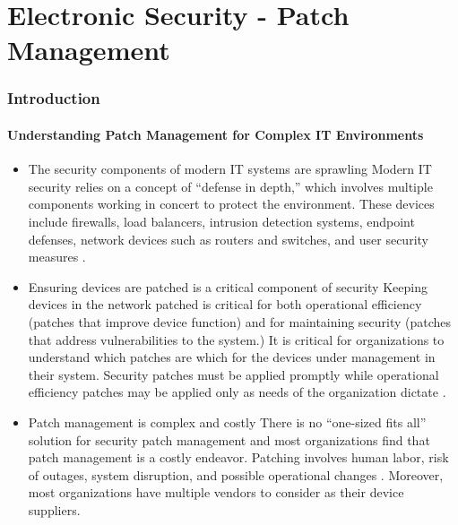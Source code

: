 \section{Electronic Security - Patch Management}
\begin{frame}
  \frametitle{Introduction}
  \framesubtitle{Understanding Patch Management for Complex IT Environments}
  \begin{itemize}
    \item<1-> The security components of modern IT systems are sprawling
       {\scriptsize{Modern IT security relies on a concept of ``defense in depth,'' which involves multiple components working in concert to protect the environment. These devices include firewalls, load balancers, intrusion detection systems, endpoint defenses, network devices such as routers and switches, and user security measures \parencite{cisdid}.}}

    \item<2-> Ensuring devices are patched is a critical component of security
       {\scriptsize{Keeping devices in the network patched is critical for both operational efficiency (patches that improve device function) and for maintaining security (patches that address vulnerabilities to the system.) It is critical for organizations to understand which patches are which for the devices under management in their system. Security patches must be applied promptly while operational efficiency patches may be applied only as needs of the organization dictate \parencite {dhs2016}.}}

    \item<3-> Patch management is complex and costly
       {\scriptsize{There is no ``one-sized fits all'' solution for security patch management and most organizations find that patch management is a costly endeavor. Patching involves human labor, risk of outages, system disruption, and possible operational changes \parencite{dey2015}. Moreover, most organizations have multiple vendors to consider as their device suppliers.}}

  \end{itemize}
\end{frame}
